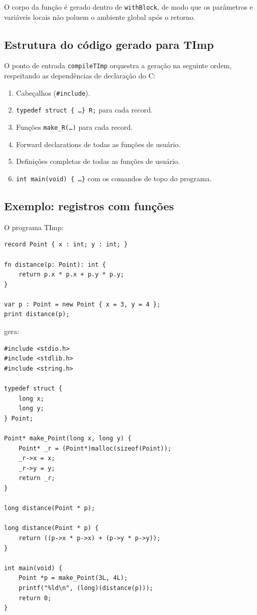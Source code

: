 O corpo da função é gerado dentro de \texttt{withBlock}, de modo que os
parâmetros e variáveis locais não poluem o ambiente global após o retorno.

\subsection{Estrutura do código gerado para TImp}

O ponto de entrada \texttt{compileTImp} orquestra a geração na seguinte
ordem, respeitando as dependências de declaração do C:

\begin{enumerate}
  \item Cabeçalhos (\texttt{\#include}).
  \item \texttt{typedef struct \{ \ldots \} R;} para cada record.
  \item Funções \texttt{make\_R(\ldots)} para cada record.
  \item Forward declarations de todas as funções de usuário.
  \item Definições completas de todas as funções de usuário.
  \item \texttt{int main(void) \{ \ldots \}} com os comandos de topo
    do programa.
\end{enumerate}

\subsection{Exemplo: registros com funções}

O programa TImp:
\begin{verbatim}
record Point { x : int; y : int; }

fn distance(p: Point): int {
    return p.x * p.x + p.y * p.y;
}

var p : Point = new Point { x = 3, y = 4 };
print distance(p);
\end{verbatim}

gera:

\begin{verbatim}
#include <stdio.h>
#include <stdlib.h>
#include <string.h>

typedef struct {
    long x;
    long y;
} Point;

Point* make_Point(long x, long y) {
    Point* _r = (Point*)malloc(sizeof(Point));
    _r->x = x;
    _r->y = y;
    return _r;
}

long distance(Point * p);

long distance(Point * p) {
    return ((p->x * p->x) + (p->y * p->y));
}

int main(void) {
    Point *p = make_Point(3L, 4L);
    printf("%ld\n", (long)(distance(p)));
    return 0;
}
\end{verbatim}

